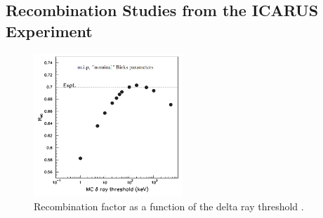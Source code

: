 %

\subsection{Recombination Studies from the ICARUS Experiment}
\label{sec:icarus}

\begin{figure}[bp!]
\centering 
\includegraphics[width=0.5\textwidth]{icarus_recomb}
\caption[Recombination Factor Against Delta Ray Threshold]{
Recombination factor as a function of the delta ray threshold \cite{icarus_recomb}.
}
\label{fig:icarus_recomb}
\end{figure}

